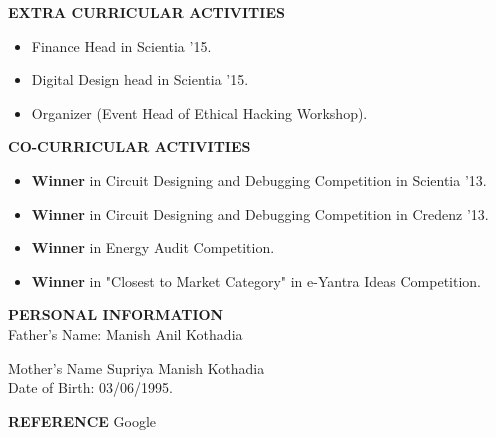 \documentclass[]{article}
\begin{document}
\begin{flushleft}
\vspace{0.15in}
{\large \bf EXTRA CURRICULAR ACTIVITIES}
\begin{itemize}
\hspace{0.5in}
\vspace{-0.22in}
\addtolength{\itemindent}{1in}
\item Finance Head in Scientia '15.
\item Digital Design head in Scientia '15.
\item Organizer (Event Head of Ethical Hacking Workshop).
\end{itemize}
\end{flushleft}


\begin{flushleft}
\vspace{0.15in}
{\large \bf CO-CURRICULAR ACTIVITIES}
\begin{itemize}
\hspace{0.5in}
\vspace{-0.22in}
\addtolength{\itemindent}{1in}
\item {\bf Winner} in Circuit Designing and Debugging Competition in Scientia '13.
\item {\bf Winner} in Circuit Designing and Debugging Competition in Credenz '13.
\item {\bf Winner} in Energy Audit Competition.
\item {\bf Winner} in "Closest to Market Category" in e-Yantra Ideas Competition. 
\end{itemize}
\end{flushleft}


\begin{flushleft}
\vspace{0.15in}
{\large \bf PERSONAL INFORMATION}\\
\vspace{0.15in}
Father's Name:
\hspace{0.5in}
Manish Anil Kothadia
\vspace{0.15in}


Mother's Name
\hspace{0.5in}
Supriya Manish Kothadia\\
\vspace{0.15in}
Date of Birth:
\hspace{0.5in}
03/06/1995.
\end{flushleft}


\begin{flushleft}
\vspace{0.15in}
{\large \bf REFERENCE}
\hspace{0.2in}
Google
\end{flushleft}
\end{document}

